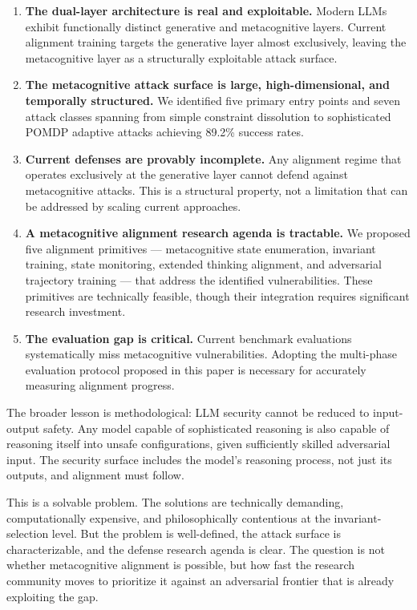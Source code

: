\documentclass[
  11pt,
]{article}
\begin{document}
\begin{enumerate}
\def\labelenumi{\arabic{enumi}.}
\item
  \textbf{The dual-layer architecture is real and exploitable.} Modern
  LLMs exhibit functionally distinct generative and metacognitive
  layers. Current alignment training targets the generative layer almost
  exclusively, leaving the metacognitive layer as a structurally
  exploitable attack surface.
\item
  \textbf{The metacognitive attack surface is large, high-dimensional,
  and temporally structured.} We identified five primary entry points
  and seven attack classes spanning from simple constraint dissolution
  to sophisticated POMDP adaptive attacks achieving 89.2\% success
  rates.
\item
  \textbf{Current defenses are provably incomplete.} Any alignment
  regime that operates exclusively at the generative layer cannot defend
  against metacognitive attacks. This is a structural property, not a
  limitation that can be addressed by scaling current approaches.
\item
  \textbf{A metacognitive alignment research agenda is tractable.} We
  proposed five alignment primitives --- metacognitive state
  enumeration, invariant training, state monitoring, extended thinking
  alignment, and adversarial trajectory training --- that address the
  identified vulnerabilities. These primitives are technically feasible,
  though their integration requires significant research investment.
\item
  \textbf{The evaluation gap is critical.} Current benchmark evaluations
  systematically miss metacognitive vulnerabilities. Adopting the
  multi-phase evaluation protocol proposed in this paper is necessary
  for accurately measuring alignment progress.
\end{enumerate}

The broader lesson is methodological: LLM security cannot be reduced to
input-output safety. Any model capable of sophisticated reasoning is
also capable of reasoning itself into unsafe configurations, given
sufficiently skilled adversarial input. The security surface includes
the model's reasoning process, not just its outputs, and alignment must
follow.

This is a solvable problem. The solutions are technically demanding,
computationally expensive, and philosophically contentious at the
invariant-selection level. But the problem is well-defined, the attack
surface is characterizable, and the defense research agenda is clear.
The question is not whether metacognitive alignment is possible, but how
fast the research community moves to prioritize it against an
adversarial frontier that is already exploiting the gap.
\end{document}
